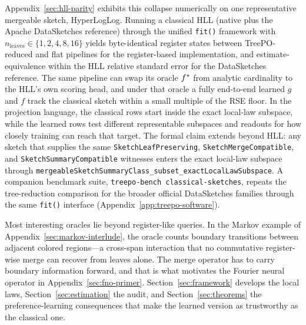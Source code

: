Appendix~\ref{sec:hll-parity} exhibits this collapse numerically on one
representative mergeable sketch, HyperLogLog. Running a classical HLL
(native plus the Apache DataSketches reference) through the unified
\texttt{fit()} framework with $n_{\mathrm{leaves}} \in \{1, 2, 4, 8,
16\}$ yields byte-identical register states between TreePO-reduced and
flat pipelines for the register-based implementation, and
estimate-equivalence within the HLL relative standard error for the
DataSketches reference. The same pipeline can swap its oracle $f^\ast$
from analytic cardinality to the
HLL's own scoring head, and under that oracle a fully end-to-end learned
$g$ and $f$ track the classical sketch within a small multiple of the RSE
floor. In the projection language, the
classical rows start inside the exact local-law subspace, while the
learned rows test different representable subspaces and readouts for how
closely training can reach that target. The formal claim extends beyond
HLL: any sketch that supplies the
same \texttt{SketchLeafPreserving}, \texttt{SketchMergeCompatible}, and
\texttt{SketchSummaryCompatible} witnesses enters the exact local-law
subspace through
\texttt{mergeableSketchSummaryClass\_subset\_exactLocalLawSubspace}.
A companion benchmark suite, \texttt{treepo-bench classical-sketches},
repeats the tree-reduction comparison for the broader official
DataSketches families through the same \texttt{fit()} interface
(Appendix~\ref{app:treepo-software}).

Most interesting oracles lie beyond register-like queries. In the Markov example of Appendix~\ref{sec:markov-interlude}, the oracle counts boundary transitions between adjacent colored regions---a cross-span interaction that no commutative register-wise merge can recover from leaves alone. The merge operator has to carry boundary information forward, and that is what motivates the Fourier neural operator in Appendix~\ref{sec:fno-primer}. Section~\ref{sec:framework} develops the local laws, Section~\ref{sec:estimation} the audit, and Section~\ref{sec:theorems} the preference-learning consequences that make the learned version as trustworthy as the classical one.
